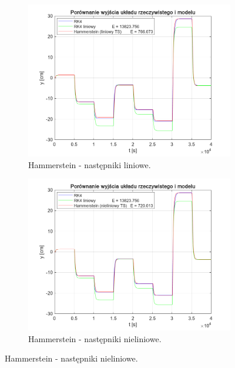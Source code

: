 \begin{figure}[b!]
\centering
\begin{subfigure}[b]{0.49\paperwidth}
\centering
\includegraphics[width=\linewidth]{pictures/HammersteinLinearModel_5}
\caption{Hammerstein - następniki liniowe.}
\end{subfigure}
\hfill
\begin{subfigure}[b]{0.49\paperwidth}
\centering
\includegraphics[width=\linewidth]{pictures/HammersteinNonlinearModel_5}
\caption{Hammerstein - następniki nieliniowe.}
\end{subfigure}
    
\vspace{0.5cm} %


\end{figure}
